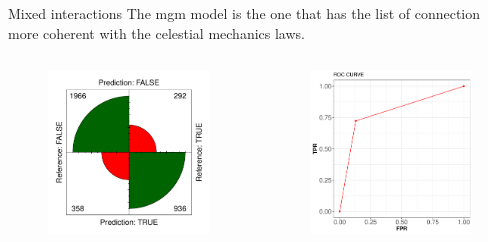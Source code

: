 \documentclass{beamer}
\begin{document}
\begin{frame}{Mixed interactions}
The mgm model is the one that has the list of connection more coherent with the celestial mechanics laws. 
\begin{columns}
  \begin{figure}[b]{\textwidth}
    \includegraphics[width=\textwidth]{Pic/mgm_confusion.pdf}
  \end{figure} 
  \begin{figure}[b]{\textwidth}
    \includegraphics[width=\textwidth]{Pic/ROC_mgm.pdf}
  \end{figure}
\end{columns}
\end{frame}
\end{document}
